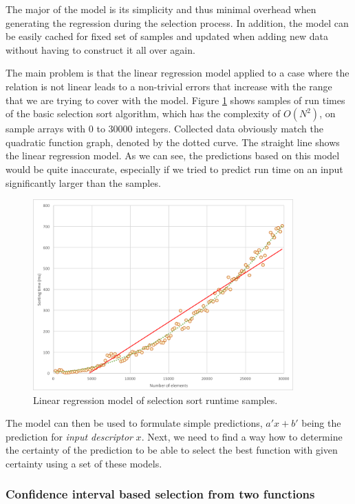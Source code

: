 The major of the model is its simplicity and thus minimal overhead when generating the regression during the selection process. In addition, the model can be easily cached for fixed set of samples and updated when adding new data without having to construct it all over again.

The main problem is that the linear regression model applied to a case where the relation is not linear leads to a non-trivial errors that increase with the range that we are trying to cover with the model. Figure \ref{fig:selection_sort_linear_trendline} shows samples of run times of the basic selection sort algorithm, which has the complexity of \(O(N^2)\), on sample arrays with 0 to 30000 integers. Collected data obviously match the quadratic function graph, denoted by the dotted curve. The straight line shows the linear regression model. As we can see, the predictions based on this model would be quite inaccurate, especially if we tried to predict run time on an input significantly larger than the samples.

\begin{figure}[h!]
	\captionsetup{justification=centering,margin=0.5cm}
	\centerline{\mbox{\includegraphics[width=100mm]{./img/selection_sort_linear_trendline.png}}}
	\caption{Linear regression model of selection sort runtime samples.}
	\label{fig:selection_sort_linear_trendline}
\end{figure}

The model can then be used to formulate simple predictions, $a'x + b'$ being the prediction for \textit{input descriptor} $x$. Next, we need to find a way how to determine the certainty of the prediction to be able to select the best function with given certainty using a set of these models.

\subsubsection{Confidence interval based selection from two functions}
\label{subsubsec:confidence_interval_selection}


